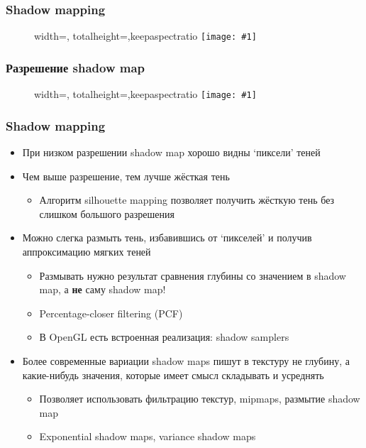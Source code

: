 \documentclass{beamer}
\newcommand{\slideimage}[1]{
  \begin{figure}
    \begin{adjustbox}{width=\textwidth, totalheight=\textheight-2\baselineskip-2\baselineskip,keepaspectratio}
      \texttt{[image: \#1]}
    \end{adjustbox}
  \end{figure}
}
\begin{document}
\begin{frame}[fragile]
\frametitle{Shadow mapping}
\slideimage{shadow-mapping3.png}
\end{frame}

\begin{frame}[fragile]
\frametitle{Разрешение shadow map}
\slideimage{shadow-map-resolution.png}
\end{frame}

\begin{frame}[fragile]
\frametitle{Shadow mapping}
\fontsize{10pt}{10pt}
\begin{itemize}
\item При низком разрешении shadow map хорошо видны `пиксели' теней
\pause
\item Чем выше разрешение, тем лучше жёсткая тень
\pause
\begin{itemize}
\item Алгоритм silhouette mapping позволяет получить жёсткую тень без слишком большого разрешения
\end{itemize}
\pause
\item Можно слегка размыть тень, избавившись от `пикселей' и получив аппроксимацию мягких теней
\pause
\begin{itemize}
\item Размывать нужно результат сравнения глубины со значением в shadow map, а \textbf{не} саму shadow map!
\pause
\item Percentage-closer filtering (PCF)
\pause
\item В OpenGL есть встроенная реализация: shadow samplers
\end{itemize}
\pause
\item Более современные вариации shadow maps пишут в текстуру не глубину, а какие-нибудь значения, которые имеет смысл складывать и усреднять
\pause
\begin{itemize}
\item Позволяет использовать фильтрацию текстур, mipmaps, размытие shadow map
\pause
\item Exponential shadow maps, variance shadow maps
\end{itemize}
\end{itemize}
\end{frame}
\end{document}
